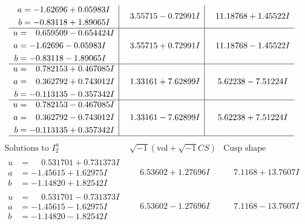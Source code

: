 \documentclass[1p]{elsarticle_modified}
\theoremstyle{definition}
\newcommand{\I}{\sqrt{-1}}
\begin{document}
$$\begin{array}{c|c|c}
\begin{aligned}
a &= -1.62696 + 0.05983 I \\
b &= -0.83118 + 1.89065 I\end{aligned}
 & \phantom{-}3.55715 - 0.72991 I & \phantom{-}11.18768 + 1.45522 I \\ \hline\begin{aligned}
u &= \phantom{-}0.659509 - 0.654424 I \\
a &= -1.62696 - 0.05983 I \\
b &= -0.83118 - 1.89065 I\end{aligned}
 & \phantom{-}3.55715 + 0.72991 I & \phantom{-}11.18768 - 1.45522 I \\ \hline\begin{aligned}
u &= \phantom{-}0.782153 + 0.467085 I \\
a &= \phantom{-}0.362792 + 0.743012 I \\
b &= -0.113135 - 0.357342 I\end{aligned}
 & \phantom{-}1.33161 + 7.62899 I & \phantom{-}5.62238 - 7.51224 I \\ \hline\begin{aligned}
u &= \phantom{-}0.782153 - 0.467085 I \\
a &= \phantom{-}0.362792 - 0.743012 I \\
b &= -0.113135 + 0.357342 I\end{aligned}
 & \phantom{-}1.33161 - 7.62899 I & \phantom{-}5.62238 + 7.51224 I\\
 \hline 
 \end{array}$$\newpage$$\begin{array}{c|c|c}  
\text{Solutions to }I^u_{2}& \I (\text{vol} + \sqrt{-1}CS) & \text{Cusp shape}\\
 \hline 
\begin{aligned}
u &= \phantom{-}0.531701 + 0.731373 I \\
a &= -1.45615 + 1.62975 I \\
b &= -1.14820 + 1.82542 I\end{aligned}
 & \phantom{-}6.53602 + 1.27696 I & \phantom{-}7.1168 + 13.7607 I \\ \hline\begin{aligned}
u &= \phantom{-}0.531701 - 0.731373 I \\
a &= -1.45615 - 1.62975 I \\
b &= -1.14820 - 1.82542 I\end{aligned}
 & \phantom{-}6.53602 - 1.27696 I & \phantom{-}7.1168 - 13.7607 I \\ \hline\begin{aligned}

\end{aligned}
\end{array}$$
\end{document}
